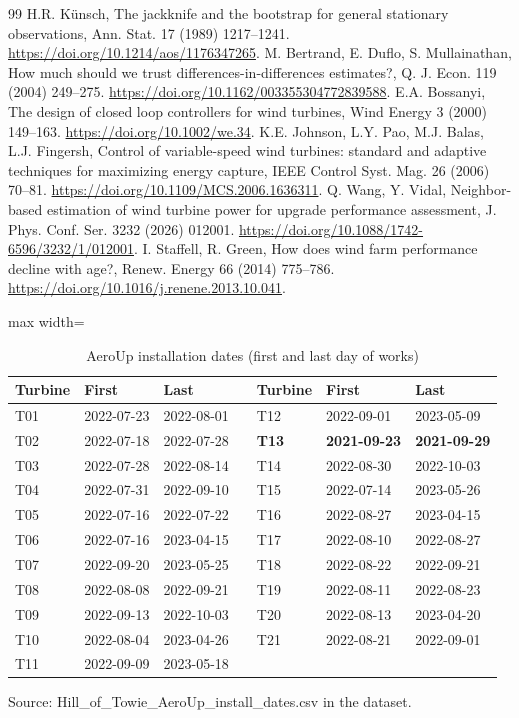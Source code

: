 \documentclass[preprint,12pt]{elsarticle}
\begin{document}
\begin{thebibliography}{99}
 H.R. Künsch, The jackknife and the bootstrap for general stationary observations, Ann. Stat. 17 (1989) 1217--1241. \url{https://doi.org/10.1214/aos/1176347265}.
 M. Bertrand, E. Duflo, S. Mullainathan, How much should we trust differences-in-differences estimates?, Q. J. Econ. 119 (2004) 249--275. \url{https://doi.org/10.1162/003355304772839588}.
 E.A. Bossanyi, The design of closed loop controllers for wind turbines, Wind Energy 3 (2000) 149--163. \url{https://doi.org/10.1002/we.34}.
 K.E. Johnson, L.Y. Pao, M.J. Balas, L.J. Fingersh, Control of variable-speed wind turbines: standard and adaptive techniques for maximizing energy capture, IEEE Control Syst. Mag. 26 (2006) 70--81. \url{https://doi.org/10.1109/MCS.2006.1636311}.
 Q. Wang, Y. Vidal, Neighbor-based estimation of wind turbine power for upgrade performance assessment, J. Phys. Conf. Ser. 3232 (2026) 012001. \url{https://doi.org/10.1088/1742-6596/3232/1/012001}.
 I. Staffell, R. Green, How does wind farm performance decline with age?, Renew. Energy 66 (2014) 775--786. \url{https://doi.org/10.1016/j.renene.2013.10.041}.
\end{thebibliography}

\clearpage
\begin{table}[htbp]
\centering
\caption{AeroUp installation dates (first and last day of works)}
\label{tab:install}
\small
\begin{adjustbox}{max width=\textwidth}
\begin{tabular}{lllllll}
\toprule
Turbine & First & Last &  & Turbine & First & Last \\
\midrule
T01 & 2022-07-23 & 2022-08-01 &  & T12 & 2022-09-01 & 2023-05-09 \\
T02 & 2022-07-18 & 2022-07-28 &  & \textbf{T13} & \textbf{2021-09-23} & \textbf{2021-09-29} \\
T03 & 2022-07-28 & 2022-08-14 &  & T14 & 2022-08-30 & 2022-10-03 \\
T04 & 2022-07-31 & 2022-09-10 &  & T15 & 2022-07-14 & 2023-05-26 \\
T05 & 2022-07-16 & 2022-07-22 &  & T16 & 2022-08-27 & 2023-04-15 \\
T06 & 2022-07-16 & 2023-04-15 &  & T17 & 2022-08-10 & 2022-08-27 \\
T07 & 2022-09-20 & 2023-05-25 &  & T18 & 2022-08-22 & 2022-09-21 \\
T08 & 2022-08-08 & 2022-09-21 &  & T19 & 2022-08-11 & 2022-08-23 \\
T09 & 2022-09-13 & 2022-10-03 &  & T20 & 2022-08-13 & 2023-04-20 \\
T10 & 2022-08-04 & 2023-04-26 &  & T21 & 2022-08-21 & 2022-09-01 \\
T11 & 2022-09-09 & 2023-05-18 &  &  &  &  \\
\bottomrule
\end{tabular}
\end{adjustbox}

\par\smallskip\parbox{0.95\textwidth}{\footnotesize Source: Hill\_of\_Towie\_AeroUp\_install\_dates.csv in the dataset.}
\end{table}
\end{document}

